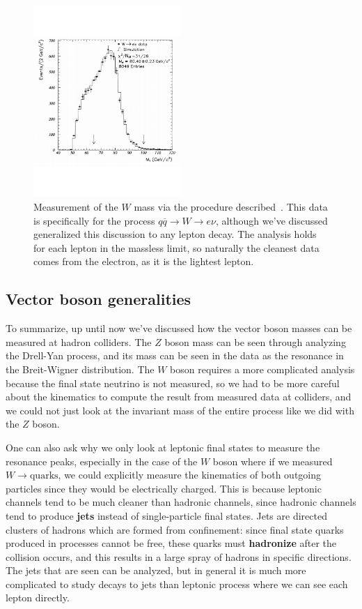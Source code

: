 \documentclass[11pt, oneside]{article}   	%
\theoremstyle{definition}
\numberwithin{equation}{subsection}		%
\begin{document}
\begin{figure}[H]
	\centering
	\includegraphics[width = 0.5\textwidth]{w_boson_mass}
	\caption{Measurement of the $W$ mass via the procedure described~\cite{w_mass}. This data is specifically for the process 
	$q\overline q\rightarrow W\rightarrow e\nu$, although we've discussed generalized this discussion to any lepton decay. The 
	analysis holds for each lepton in the massless limit, so naturally the cleanest data comes from the electron, as it is the lightest 
	lepton. }
	\label{fig:w_mass}
\end{figure}

\subsection{Vector boson generalities}

To summarize, up until now we've discussed how the vector boson masses can be measured at hadron colliders. The $Z$ boson mass can 
be seen through analyzing the Drell-Yan process, and its mass can be seen in the data as the resonance in the Breit-Wigner distribution. 
The $W$ boson requires a more complicated analysis because the final state neutrino is not measured, so we had to be more careful 
about the kinematics to compute the result from measured data at colliders, and we could not just look at the invariant mass of the 
entire process like we did with the $Z$ boson. 

One can also ask why we only look at leptonic final states to measure the resonance peaks, especially in the case of the $W$ boson where 
if we measured $W\rightarrow\mathrm{quarks}$, we could explicitly measure the kinematics of both outgoing particles since they would 
be electrically charged. This is because leptonic channels tend to be much cleaner than hadronic channels, since hadronic channels 
tend to produce \textbf{jets} instead of single-particle final states. Jets are directed clusters of hadrons which are formed from confinement: 
since final state quarks produced in processes cannot be free, these quarks must \textbf{hadronize} after the collision occurs, and this 
results in a large spray of hadrons in specific directions. The jets that are seen can be analyzed, but in general it is much more complicated to 
study decays to jets than leptonic process where we can see each lepton directly. 
\end{document}
